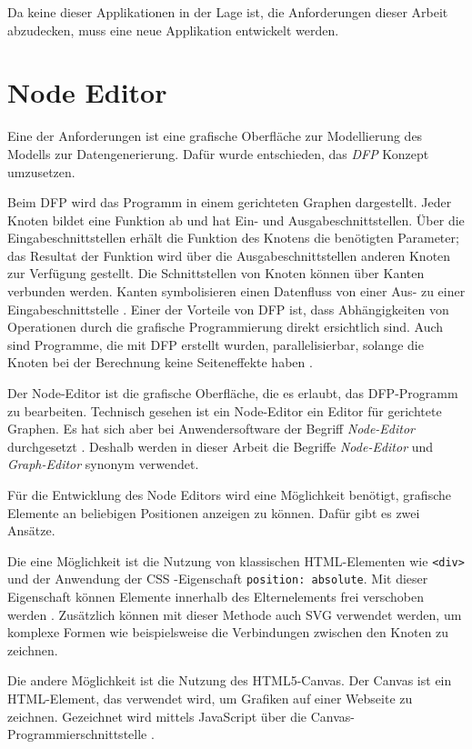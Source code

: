 Da keine dieser Applikationen in der Lage ist, die Anforderungen dieser Arbeit abzudecken, muss eine neue Applikation entwickelt werden.

\section{Node Editor}

Eine der Anforderungen ist eine grafische Oberfläche zur Modellierung des Modells zur Datengenerierung. Dafür wurde entschieden, das \textit{\ac{DFP}} Konzept umzusetzen.

Beim \ac{DFP} wird das Programm in einem gerichteten Graphen dargestellt. Jeder Knoten bildet eine Funktion ab und hat Ein- und Ausgabeschnittstellen. Über die Eingabeschnittstellen erhält die Funktion des Knotens die benötigten Parameter; das Resultat der Funktion wird über die Ausgabeschnittstellen anderen Knoten zur Verfügung gestellt. Die Schnittstellen von Knoten können über Kanten verbunden werden. Kanten symbolisieren einen Datenfluss von einer Aus- zu einer Eingabeschnittstelle \cite{dataflow}. Einer der Vorteile von \ac{DFP} ist, dass Abhängigkeiten von Operationen durch die grafische Programmierung direkt ersichtlich sind. Auch sind Programme, die mit \ac{DFP} erstellt wurden, parallelisierbar, solange die Knoten bei der Berechnung keine Seiteneffekte haben \cite{dataflow}.

Der Node-Editor ist die grafische Oberfläche, die es erlaubt, das \ac{DFP}-Programm zu bearbeiten. Technisch gesehen ist ein Node-Editor ein Editor für gerichtete Graphen. Es hat sich aber bei Anwendersoftware der Begriff \textit{Node-Editor} durchgesetzt \cite{nodeeditor:blender, nodeeditor:maya}. Deshalb werden in dieser Arbeit die Begriffe \textit{Node-Editor} und \textit{Graph-Editor} synonym verwendet.

Für die Entwicklung des Node Editors wird eine Möglichkeit benötigt, grafische Elemente an beliebigen Positionen anzeigen zu können. Dafür gibt es zwei Ansätze.

Die eine Möglichkeit ist die Nutzung von klassischen \ac{HTML}-Elementen wie \texttt{<div>} und der Anwendung der \ac{CSS}
-Eigenschaft \texttt{position: absolute}. Mit dieser Eigenschaft können Elemente innerhalb des Elternelements frei verschoben werden \cite{mdn:position}. Zusätzlich können mit dieser Methode auch \ac{SVG} verwendet werden, um komplexe Formen wie beispielsweise die Verbindungen zwischen den Knoten zu zeichnen.

Die andere Möglichkeit ist die Nutzung des HTML5-Canvas. Der Canvas ist ein HTML-Element, das verwendet wird, um Grafiken auf einer Webseite zu zeichnen. Gezeichnet wird mittels JavaScript über die Canvas-Programmierschnittstelle \cite{mdn:canvas}.

